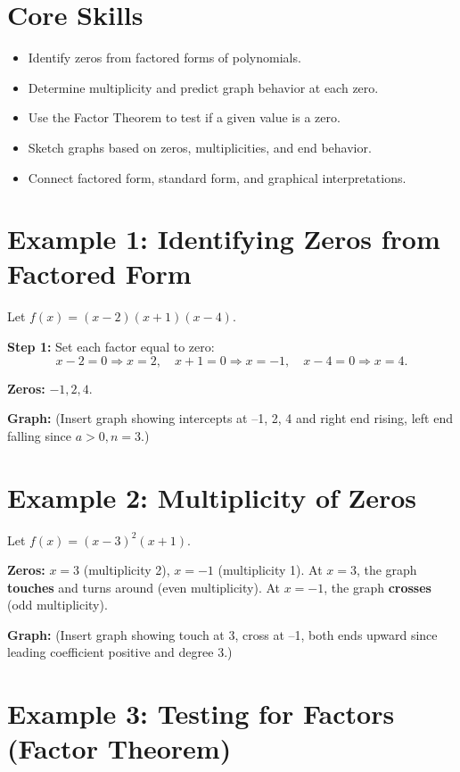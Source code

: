 \documentclass[12pt]{article}
\begin{document}
\section*{Core Skills}
\begin{itemize}
  \item Identify zeros from factored forms of polynomials.
  \item Determine multiplicity and predict graph behavior at each zero.
  \item Use the Factor Theorem to test if a given value is a zero.
  \item Sketch graphs based on zeros, multiplicities, and end behavior.
  \item Connect factored form, standard form, and graphical interpretations.
\end{itemize}

\section*{Example 1: Identifying Zeros from Factored Form}

Let \(f(x) = (x - 2)(x + 1)(x - 4)\).

\textbf{Step 1:} Set each factor equal to zero:
\[
x - 2 = 0 \Rightarrow x = 2, \quad x + 1 = 0 \Rightarrow x = -1, \quad x - 4 = 0 \Rightarrow x = 4.
\]

\textbf{Zeros:} \(-1, 2, 4.\)

\textbf{Graph:} (Insert graph showing intercepts at –1, 2, 4 and right end rising, left end falling since \(a > 0, n = 3.\))

\section*{Example 2: Multiplicity of Zeros}

Let \(f(x) = (x - 3)^2(x + 1).\)

\textbf{Zeros:} \(x = 3\) (multiplicity 2), \(x = -1\) (multiplicity 1).  
At \(x = 3\), the graph \textbf{touches} and turns around (even multiplicity).  
At \(x = -1\), the graph \textbf{crosses} (odd multiplicity).

\textbf{Graph:} (Insert graph showing touch at 3, cross at –1, both ends upward since leading coefficient positive and degree 3.)

\section*{Example 3: Testing for Factors (Factor Theorem)}
\end{document}
